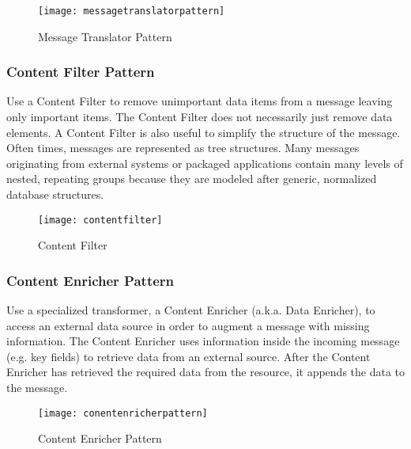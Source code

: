 \begin{figure}[H]
  \center
  \texttt{[image: messagetranslatorpattern]}
  \caption{Message Translator Pattern}
\end{figure}

\subsubsection{Content Filter Pattern}
Use a Content Filter to remove unimportant data items from a message leaving only important items. The Content Filter does not necessarily just remove data elements. A Content Filter is also useful to simplify the structure of the message. Often times, messages are represented as tree structures. Many messages originating from external systems or packaged applications contain many levels of nested, repeating groups because they are modeled after generic, normalized database structures.

\begin{figure}[H]
  \center
  \texttt{[image: contentfilter]}
  \caption{Content Filter}
\end{figure}

\subsubsection{Content Enricher Pattern}
Use a specialized transformer, a Content Enricher (a.k.a. Data Enricher), to access an external data source in order to augment a message with missing information. The Content Enricher uses information inside the incoming message (e.g. key fields) to retrieve data from an external source. After the Content Enricher has retrieved the required data from the resource, it appends the data to the message.

\begin{figure}[H]
  \center
  \texttt{[image: conentenricherpattern]}
  \caption{Content Enricher Pattern}
\end{figure}

